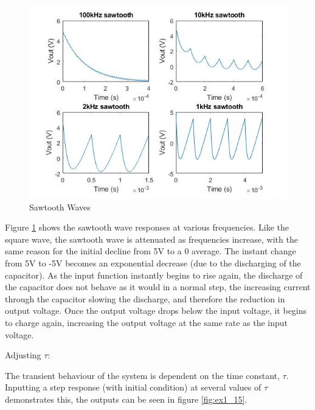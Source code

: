 \documentclass[11pt, oneside, titlepage]{article}   	%
\begin{document}
\begin{figure}[H]
\center
\includegraphics[scale = 0.5]{exercise1_14}
\caption{Sawtooth Waves} \label{fig:ex1_14}
\end{figure}

Figure \ref{fig:ex1_14} shows the sawtooth wave responses at various frequencies. Like the square wave, the sawtooth wave is attenuated as frequencies increase, with the same reason for the initial decline from 5V to a 0 average. The instant change from 5V to -5V becomes an exponential decrease (due to the discharging of the capacitor). As the input function instantly begins to rise again, the discharge of the capacitor does not behave as it would in a normal step, the increasing current through the capacitor slowing the discharge, and therefore the reduction in output voltage. Once the output voltage drops below the input voltage, it begins to charge again, increasing the output voltage at the same rate as the input voltage.  



Adjusting $\tau$:

The transient behaviour of the system is dependent on the time constant, $\tau$. Inputting a step response (with initial condition) at several values of $\tau$ demonstrates this, the outputs can be seen in figure \ref{fig:ex1_15}.
\end{document}

